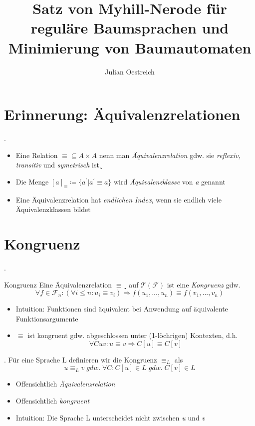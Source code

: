 \documentclass[11pt]{beamer}
\author{Julian Oestreich}
\title[Minimierung von Baumautomaten]{Satz von Myhill-Nerode für reguläre Baumsprachen und Minimierung von Baumautomaten}
\institute[Universität Leipzig]{\small{¸Seminarmodul Automatentheorie} \\ Universität Leipzig}
\makeatletter
\newif\ifplacelogo %
\newcommand*{\currentsection}{\@currentlabelname}
\makeatother
\begin{document}
\begin{frame}
\titlepage
\end{frame}

\placelogofalse

\section{Erinnerung: Äquivalenzrelationen}
\begin{frame}{\thesection. \currentsection}
\begin{itemize}
	\item Eine Relation \mbox{$ \equiv\subseteq A \times A $} nenn man \textit{Äquivalenzrelation} gdw. sie \textit{reflexiv, transitiv} und \textit{symetrisch} ist¸
	\item Die Menge \mbox{$[a]_\equiv \coloneqq \{ a^{'} |  a^{'} \equiv a\} $} wird \textit{Äquivalenzklasse} von \textit{a} genannt
	\item Eine Äquivalenzrelation hat \textit{endlichen Index}, wenn sie endlich viele Äquivalenzklassen bildet
\end{itemize}
\end{frame}

\section{Kongruenz}
\begin{frame}{\thesection. \currentsection}

	\begin{block}{Kongruenz} Eine Äquivalenzrelation \mbox{$\equiv$}¸ auf \mbox{$\mathcal{T(F)} $} ist eine \textit{Kongruenz} gdw. 
	$$\forall f \in \mathcal{F}_n:(\forall i \leq n: u_i \equiv v_i) \Longrightarrow f(u_1,...,u_n) \equiv f(v_1,...,v_n) $$
	\end{block}
	\begin{itemize}
	\item Intuition: Funktionen sind äquivalent bei Anwendung auf äquivalente Funktionsargumente
	\item $\equiv$ ist kongruent gdw. abgeschlossen unter (1-löchrigen) Kontexten, d.h. $$ \forall C u v : u \equiv v \Longrightarrow C[u] \equiv C[v]$$
	\end{itemize}
\end{frame}

\begin{frame}{\thesection. \currentsection}
Für eine Sprache L definieren wir die Kongruenz $\equiv_L$ als
$$ u \equiv_L v\; gdw.\; \forall C: C[u] \in L\; gdw.\; C[v] \in L $$
\begin{itemize}
	\item Offensichtlich \textit{Äquivalenzrelation}
	\item Offensichtlich \textit{kongruent}
	\item Intuition: Die Sprache L unterscheidet nicht zwischen \textit{u} und \textit{v}
\end{itemize}
\end{frame}
\end{document}
